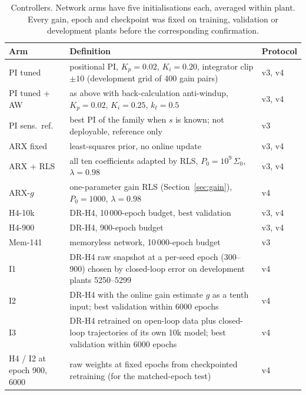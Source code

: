 \documentclass[11pt]{article}
\begin{document}
\begin{table}[!htb]\centering\small
\caption{Controllers. Network arms have five initialisations each, averaged within plant. Every gain, epoch and checkpoint was fixed on training, validation or development plants before the corresponding confirmation.}\label{tab:arms}
\begin{tabular}{@{}L{3.1cm}L{9.6cm}L{1.6cm}@{}}\toprule
Arm & Definition & Protocol\\\midrule
PI tuned & positional PI, $K_p=0.02$, $K_i=0.20$, integrator clip $\pm10$ (development grid of 400 gain pairs) & v3, v4\\
PI tuned + AW & as above with back-calculation anti-windup, $K_p=0.02$, $K_i=0.25$, $k_t=0.5$ & v3, v4\\
PI sens.\ ref. & best PI of the family when $s$ is known; not deployable, reference only & v3\\
ARX fixed & least-squares prior, no online update & v3, v4\\
ARX + RLS & all ten coefficients adapted by RLS, $P_0=10^9\,\Sigma_0$, $\lambda=0.98$ & v3, v4\\
ARX-$g$ & one-parameter gain RLS (Section~\ref{sec:gain}), $P_0=1000$, $\lambda=0.98$ & v4\\
H4-10k & DR-H4, 10\,000-epoch budget, best validation & v3, v4\\
H4-900 & DR-H4, 900-epoch budget & v3, v4\\
Mem-141 & memoryless network, 10\,000-epoch budget & v3\\
I1 & DR-H4 raw snapshot at a per-seed epoch (300--900) chosen by closed-loop error on development plants 5250--5299 & v4\\
I2 & DR-H4 with the online gain estimate $g$ as a tenth input; best validation within 6000 epochs & v4\\
I3 & DR-H4 retrained on open-loop data plus closed-loop trajectories of its own 10k model; best validation within 6000 epochs & v4\\
H4 / I2 at epoch 900, 6000 & raw weights at fixed epochs from checkpointed retraining (for the matched-epoch test) & v4\\\bottomrule
\end{tabular}\end{table}
\end{document}
